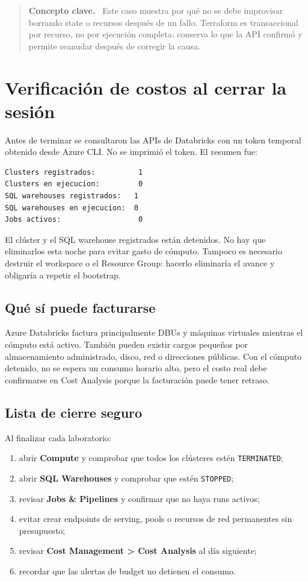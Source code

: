 \documentclass[11pt,a4paper]{article}
\newenvironment{aprendizaje}{
  \begin{quote}\color{dbblue}\textbf{Concepto clave.}\ }{
  \end{quote}}
\begin{document}
\begin{aprendizaje}
Este caso muestra por qué no se debe improvisar borrando state o recursos después de un fallo.
Terraform es transaccional por recurso, no por ejecución completa: conserva lo que la API confirmó y
permite reanudar después de corregir la causa.
\end{aprendizaje}

\section{Verificación de costos al cerrar la sesión}

Antes de terminar se consultaron las APIs de Databricks con un token temporal obtenido desde Azure
CLI. No se imprimió el token. El resumen fue:

\begin{lstlisting}
Clusters registrados:          1
Clusters en ejecucion:         0
SQL warehouses registrados:   1
SQL warehouses en ejecucion:  0
Jobs activos:                  0
\end{lstlisting}

El clúster y el SQL warehouse registrados están detenidos. No hay que eliminarlos esta noche para
evitar gasto de cómputo. Tampoco es necesario destruir el workspace o el Resource Group: hacerlo
eliminaría el avance y obligaría a repetir el bootstrap.

\subsection{Qué sí puede facturarse}

Azure Databricks factura principalmente DBUs y máquinas virtuales mientras el cómputo está activo.
También pueden existir cargos pequeños por almacenamiento administrado, disco, red o direcciones
públicas. Con el cómputo detenido, no se espera un consumo horario alto, pero el costo real debe
confirmarse en Cost Analysis porque la facturación puede tener retraso.

\subsection{Lista de cierre seguro}

Al finalizar cada laboratorio:

\begin{enumerate}
  \item abrir \textbf{Compute} y comprobar que todos los clústeres estén \texttt{TERMINATED};
  \item abrir \textbf{SQL Warehouses} y comprobar que estén \texttt{STOPPED};
  \item revisar \textbf{Jobs \& Pipelines} y confirmar que no haya runs activos;
  \item evitar crear endpoints de serving, pools o recursos de red permanentes sin presupuesto;
  \item revisar \textbf{Cost Management > Cost Analysis} al día siguiente;
  \item recordar que las alertas de budget no detienen el consumo.
\end{enumerate}
\end{document}
